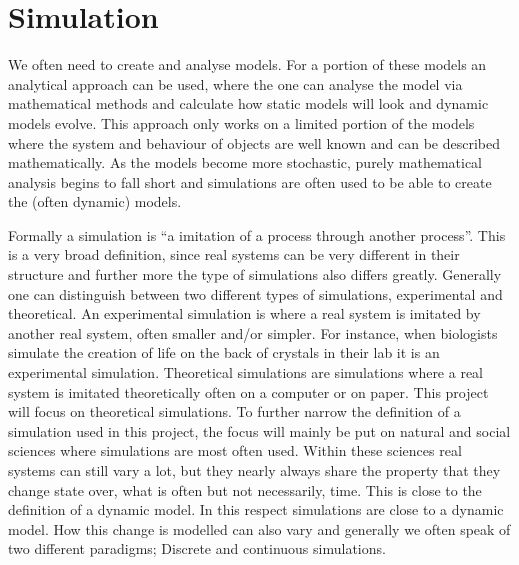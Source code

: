 \section{Simulation}
We often need to create and analyse models. %
For a portion of these models an analytical approach can be used, where the one can analyse the model via mathematical methods and calculate how static models will look and dynamic models evolve. This approach only works on a limited portion of the models where the system and behaviour of objects are well known and can be described mathematically. As the models become more stochastic, purely mathematical analysis begins to fall short and simulations are often used to be able to create the (often dynamic) models.

Formally a simulation is \enquote{a imitation of a process through another process}. This is a very broad definition, since real systems can be very different in their structure and further more the type of simulations also differs greatly. Generally one can distinguish between two different types of simulations, experimental and theoretical. An experimental simulation is where a real system is imitated by another real system, often smaller and/or simpler. For instance, when biologists simulate the creation of life on the back of crystals in their lab it is an experimental simulation. Theoretical simulations are simulations where a real system is imitated theoretically often on a computer or on paper. This project will focus on theoretical simulations. To further narrow the definition of a simulation used in this project, the focus will mainly be put on natural and social sciences where simulations are most often used. Within these sciences real systems can still vary a lot, but they nearly always share the property that they change state over, what is often but not necessarily, time. This is close to the definition of a dynamic model. In this respect simulations are close to a dynamic model. How this change is modelled can also vary and generally we often speak of two different paradigms; Discrete and continuous simulations.

